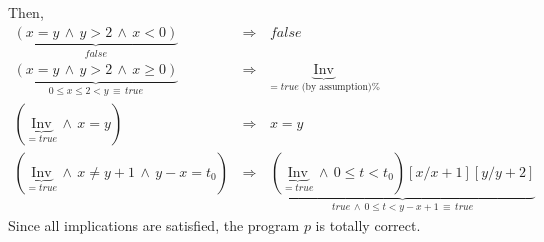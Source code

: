 Then,%
\begin{eqnarray*}
\underbrace{(x=y\,\wedge \,y>2\,\wedge \,x<0)}_{false}\, &\Rightarrow
&\,false \\
\underbrace{(x=y\,\wedge \,y>2\,\wedge \,x\geq 0)}_{0\leq x\leq 2<y\,\equiv\,
true}\, &\Rightarrow& \underbrace{\mathrm{Inv}}_{=true\;\text{(by assumption)%
}}\, \\
(\underbrace{\mathrm{Inv}}_{=true}\,\wedge \,x =y)\,&\Rightarrow& \,x=y \\
(\underbrace{\mathrm{Inv}}_{=true}\,\wedge \,x \neq y+1\,\wedge
\,y-x=t_{0})\,&\Rightarrow& \,\underbrace{(\underbrace{\mathrm{Inv}}%
_{=true}\,\wedge \,0\leq t<t_{0})[x/x+1][y/y+2]}_{true\,\wedge \,0 \leq t < y-x+1\, \equiv\, true}
\end{eqnarray*}
Since all implications are satisfied, the program $p$ is totally correct.







